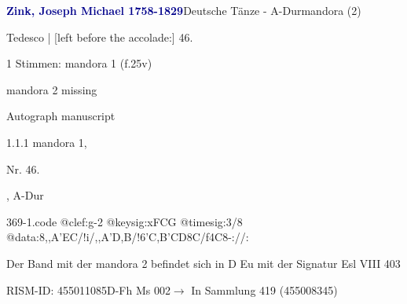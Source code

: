 \documentclass[twocolumn, 12pt]{book}
\begin{document}
\par \vspace{16pt} \textcolor{darkblue}{\textbf{Zink, Joseph Michael  1758-1829}}\hfillplus{\textbf{[369]}}\newline Deutsche Tänze - A-Dur\newline mandora (2)
\par \begin{itshape}[f.25v, at left:] Tedesco | [left before the accolade:] 46.\end{itshape} 
\par \textcolor{darkblue}{}  1 Stimmen: mandora 1  (f.25v)\newline \begin{small} mandora 2 missing\end{small} \newline Autograph manuscript
\par 1.1.1  mandora 1, \begin{itshape}Nr. 46.\end{itshape}, A-Dur  
\begin{filecontents*}{369-1.code}
@clef:g-2
@keysig:xFCG
@timesig:3/8
@data:8,,A'EC/!i/,,A'D,B/!{6'C,B'CD}8C/f4C8-://:
\end{filecontents*}
\newline %
\par Der Band mit der mandora 2 befindet sich in D Eu mit der Signatur Esl VIII 403
\par RISM-ID: 455011085\newline D-Fh  Ms 002\newline $\rightarrow$ In Sammlung 419 (455008345)
      
\end{document}
